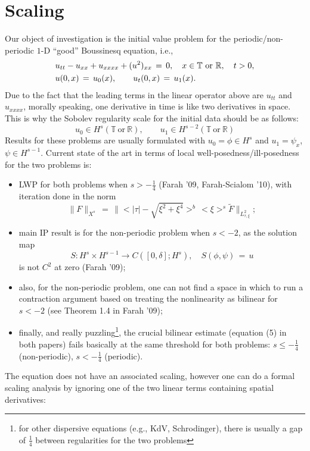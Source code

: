 \documentclass[12pt,reqno]{amsart}
\numberwithin{equation}{section}  %
\begin{document}
\section{Scaling} 
\label{sec:scaling}
Our object of investigation is the initial value problem for the
periodic/non-periodic $1$-D ``good'' Boussinesq equation, i.e.,
\begin{equation}
  \aligned
  & u_{tt}-u_{xx}+u_{xxxx}+ (u^2)_{xx}\,=\,0, \quad x\in \mathbb{T}\ \text{or} \ \mathbb{R}, \quad t>0,\\
&u(0,x)\,=\,u_0(x),\qquad u_t(0,x)\,=\,u_1(x).\endaligned
\label{main}
\end{equation}
Due to the fact that the leading terms in the linear operator above are $u_{tt}$ and $u_{xxxx}$, morally speaking, one derivative in time is like two derivatives in space. This is why the Sobolev regularity scale for the initial data should be as follows:
\[
u_0\in H^s(\mathbb{T}\ \text{or} \ \mathbb{R}), \qquad u_1\in H^{s-2}(\mathbb{T}\ \text{or} \ \mathbb{R})
\]
Results for these problems are usually formulated with $u_0=\phi \in H^s$ and $u_1=\psi_x$, $\psi\in H^{s-1}$.
Current state of the art in terms of local well-posedness/ill-posedness for the two problems is:
\begin{itemize}
  \item LWP for both problems when $s>-\frac 14$ (Farah '09, Farah-Scialom '10), with iteration done in
    the norm
    \[
    \|F\|_{X^{s}}\,=\,\|<|\tau|-\sqrt{\xi^2+\xi^4}>^b\,<\xi>^s \tilde{F}\|_{L^2_{\tau,\xi}};
    \]
  \item main IP result is for the non-periodic problem when $s<-2$, as the solution map 
    \[
    S: H^s\times H^{s-1} \to C([0,\delta]; H^s), \quad
    S(\phi,\psi)\,=\,u
    \]
    is not $C^2$ at zero (Farah '09);
  \item also, for the non-periodic problem, one can not find a space in which to run a contraction argument based on treating the nonlinearity as bilinear for $s<-2$ (see Theorem 1.4 in Farah '09);
  \item finally, and really puzzling\footnote{for other dispersive equations (e.g., KdV, Schrodinger), there is usually a gap of $\frac 14$ between regularities for the two problems}, the crucial bilinear estimate (equation (5) in both papers) fails basically at the same threshold for both problems: $s\leq -\frac 14$ (non-periodic), $s<-\frac{1}{4}$ (periodic).
\end{itemize}
The equation does not have an associated scaling, however one can do a formal scaling analysis by ignoring one of the two linear terms containing spatial derivatives:
\end{document}
